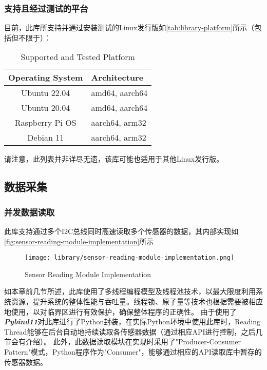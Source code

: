 \subsubsection{支持且经过测试的平台}
目前，此库所支持并通过安装测试的Linux发行版如\autoref{tab:library-platform}所示（包括但不限于）：

\begin{table}[ht]
    \caption{\label{tab:library-platform}Supported and Tested Platform}
    \begin{tabularx}{\linewidth}{|c|X<{\centering}|}
        \hline
        {\bfseries Operating System} & {\bfseries Architecture} \\ \hline
        Ubuntu 22.04 & amd64, aarch64 \\ \hline
        Ubuntu 20.04 & amd64, aarch64 \\ \hline
        Raspberry Pi OS & aarch64, arm32 \\ \hline
        Debian 11 & aarch64, arm32 \\ \hline
    \end{tabularx}
\end{table}
请注意，此列表并非详尽无遗，该库可能也适用于其他Linux发行版。
\subsection{数据采集}
\subsubsection{并发数据读取}
此库支持通过多个I2C总线同时高速读取多个传感器的数据，其内部实现如\autoref{fig:sensor-reading-module-implementation}所示

\begin{figure}[H]
    \centering
    \texttt{[image: library/sensor-reading-module-implementation.png]}
    \caption{\label{fig:sensor-reading-module-implementation}Sensor Reading Module Implementation}
\end{figure}

如本章前几节所述，此库使用了多线程编程模型及线程池技术，以最大限度利用系统资源，提升系统的整体性能与吞吐量。线程锁、原子量等技术也根据需要被相应地使用，以对临界区进行有效保护，确保整体程序的正确性。
由于使用了{\bfseries \itshape Pybind11}对此库进行了Python封装，在实际Python环境中使用此库时，Reading Thread能够在后台自动地持续读取各传感器数据（通过相应API进行控制，之后几节会有介绍）。
此外，此数据读取模块在实现时采用了"Producer-Consumer Pattern"模式，Python程序作为"Consumer"，能够通过相应的API读取库中暂存的传感器数据。

